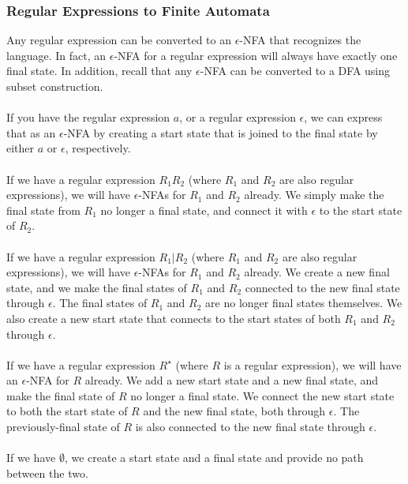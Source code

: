 \documentclass[]{article}
\theoremstyle{definition}
\begin{document}
			\subsubsection{Regular Expressions to Finite Automata}
				Any regular expression can be converted to an $\epsilon$-NFA that recognizes the language. In fact, an $\epsilon$-NFA for a regular expression will always have exactly one final state. In addition, recall that any $\epsilon$-NFA can be converted to a DFA using subset construction.
				\\ \\
				If you have the regular expression $a$, or a regular expression $\epsilon$, we can express that as an $\epsilon$-NFA by creating a start state that is joined to the final state by either $a$ or $\epsilon$, respectively.
				\\ \\
				If we have a regular expression $R_1 R_2$ (where $R_1$ and $R_2$ are also regular expressions), we will have $\epsilon$-NFAs for $R_1$ and $R_2$ already. We simply make the final state from $R_1$ no longer a final state, and connect it with $\epsilon$ to the start state of $R_2$.
				\\ \\
				If we have a regular expression $R_1 | R_2$ (where $R_1$ and $R_2$ are also regular expressions), we will have $\epsilon$-NFAs for $R_1$ and $R_2$ already. We create a new final state, and we make the final states of $R_1$ and $R_2$ connected to the new final state through $\epsilon$. The final states of $R_1$ and $R_2$ are no longer final states themselves. We also create a new start state that connects to the start states of both $R_1$ and $R_2$ through $\epsilon$.
				\\ \\
				If we have a regular expression $R^\star$ (where $R$ is a regular expression), we will have an $\epsilon$-NFA for $R$ already. We add a new start state and a new final state, and make the final state of $R$ no longer a final state. We connect the new start state to both the start state of $R$ and the new final state, both through $\epsilon$. The previously-final state of $R$ is also connected to the new final state through $\epsilon$.
				\\ \\
				If we have $\emptyset$, we create a start state and a final state and provide no path between the two.
\end{document}
